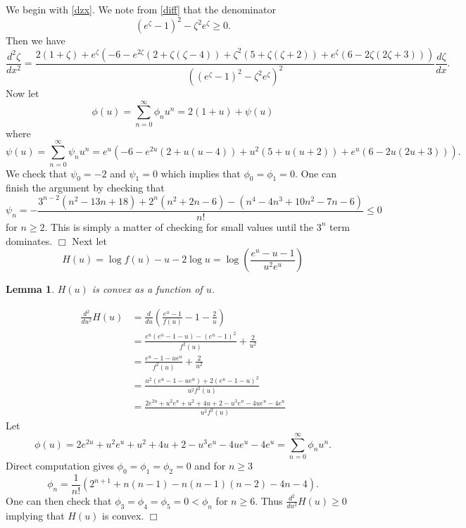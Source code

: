 \documentclass[11pt]{article}
\newenvironment{proof}{{\bf Proof:}}{\hfill\mbox{$\Box$}}
\def\f{\phi}
\def\z{\zeta}
\newtheorem{lemma}[theorem]{Lemma}
\newcommand{\brac}[1]{\left(#1\right)}
\newcommand{\bfrac}[2]{\brac{\frac{#1}{#2}}}
\begin{document}
\begin{proof}
We begin with \eqref{dzx}. We note from \eqref{diff} that the denominator
$$(e^\z-1)^2-\z^2e^\z\geq 0.$$
Then we have
$$\frac{d^2\z}{dx^2}=\frac{2(1+\z)+e^\z(-6-e^{2\z}(2+\z(\z-4))+\z^2(5+\z(\z+2))+e^\z(6-2\z(2\z+3)))}{((e^\z-1)^2-\z^2e^\z)^2}
\frac{d\z}{dx}.$$
Now let
$$\f(u)=\sum_{n=0}^\infty \f_nu^n=2(1+u)+\psi(u)$$
where
$$\psi(u)=\sum_{n=0}^\infty\psi_nu^n=e^u(-6-e^{2u}(2+u(u-4))+u^2(5+u(u+2))+e^u(6-2u(2u+3))).$$
We check that $\psi_0=-2$ and $\psi_1=0$ which implies that $\f_0=\f_1=0$. One can finish the argument by checking that
$$\psi_n=-\frac{3^{n-2}(n^2-13n+18)+2^n(n^2+2n-6)-(n^4-4n^3+10n^2-7n-6)}{n!}\leq 0$$ 
for $n\geq 2$. This is simply a matter of checking for small values until the $3^n$ term dominates.
\end{proof}
Next let 
$$
H(u) = \log f(u)-u-2\log u = \log\bfrac{e^u-u-1}{u^2e^u}
$$
\begin{lemma}\label{use3}
$H(u)$ is convex as a function of $u$.
\end{lemma}
\begin{proof}
\begin{align*}
\frac{d^2}{du^2}H(u) &= \frac{d}{du}\brac{\frac{e^u-1}{f(u)}-1-\frac{2}{u}}\\
&= \frac{e^u(e^u-1-u) - (e^u-1)^2}{f^2(u)} + \frac{2}{u^2}\\
&= \frac{e^u-1 - ue^u}{f^2(u)} + \frac{2}{u^2}\\
&= \frac{u^2(e^u-1-ue^u)+2(e^u-1-u)^2}{u^2f^2(u)}\\
&= \frac{2e^{2u}+u^2e^u+u^2+4u+2-u^3e^u-4ue^u-4e^u}{u^2f^2(u)}
\end{align*}
Let
$$\f(u)=2e^{2u}+u^2e^u+u^2+4u+2-u^3e^u-4ue^u-4e^u=\sum_{n=0}^\infty \f_nu^n.$$
Direct computation gives $\f_0=\f_1=\f_2=0$ and for $n\geq 3$ 
$$\f_n=\frac{1}{n!}(2^{n+1}+n(n-1)-n(n-1)(n-2)-4n-4).$$
One can then check that $\f_3=\f_4=\f_5=0<\f_n$ for $n\geq 6$. Thus $\frac{d^2}{du^2}H(u)\geq 0$
implying that $H(u)$ is convex.
\end{proof}
\end{document}
